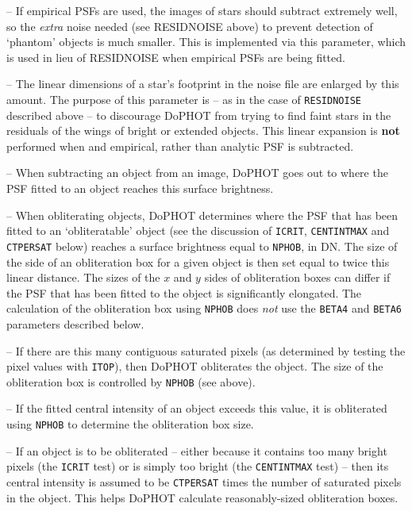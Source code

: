  -- If empirical PSFs are used, 
the images of stars should subtract extremely well, so the 
{\it extra} noise needed (see RESIDNOISE above) to prevent 
detection of `phantom' objects is much smaller. This is implemented 
via this parameter, which is used in lieu of RESIDNOISE when empirical 
PSFs are being fitted.

 --  The linear dimensions of a
star's footprint in the
noise file are enlarged by this amount.  The purpose of this
parameter is -- as in the case of {\tt RESIDNOISE} described
above -- to discourage DoPHOT from trying to find faint stars
in the residuals of the wings of bright or extended objects.
This linear expansion is {\bf not} performed when and empirical,
rather than analytic PSF is subtracted.

 -- When subtracting an object from an
image, DoPHOT goes out to where the 
PSF fitted to an object reaches this surface brightness.

 -- When obliterating objects,
DoPHOT determines where the PSF that has been fitted
to an `obliteratable' object (see the discussion of {\tt ICRIT}, 
{\tt CENTINTMAX} and {\tt CTPERSAT} below) reaches a 
surface brightness equal to {\tt NPHOB}, in DN.  
The size of the side of an obliteration box for a given object is then set 
equal to
twice this linear distance.  The sizes of the $x$ and $y$ sides of 
obliteration boxes can differ if the PSF that has been fitted to the 
object is significantly elongated.  The calculation of the
obliteration box using {\tt NPHOB} does {\it not}
use the {\tt BETA4} and {\tt BETA6} parameters
described below.

 -- If there are this many contiguous
saturated pixels (as determined by testing the pixel
values with {\tt ITOP}), then DoPHOT obliterates the object.
The size of the obliteration box is controlled by {\tt NPHOB}
(see above).  

 -- If the fitted central intensity of
an object exceeds this value, it is obliterated using {\tt NPHOB}
to determine the obliteration box size.  

 -- If an object is to be obliterated
-- either because it contains too many bright pixels (the
{\tt ICRIT} test) or is simply too bright (the {\tt CENTINTMAX}
test) -- then its central intensity is assumed to be 
{\tt CTPERSAT} times the number of saturated pixels in the
object.  This helps DoPHOT calculate reasonably-sized
obliteration boxes.  

